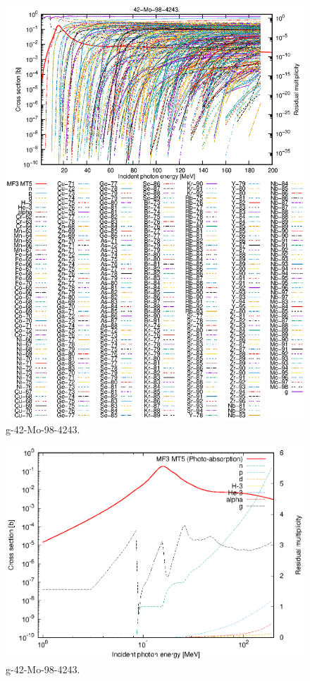 \begin{figure}
 \includegraphics[width=\linewidth]{eps/g_42-Mo-98_4243.eps}
  \caption{g-42-Mo-98-4243.}
\end{figure}
\newpage \clearpage

\begin{figure}
 \includegraphics[width=\linewidth]{eps-log/g_42-Mo-98_4243.eps}
 \caption{g-42-Mo-98-4243.}
\end{figure}
\newpage \clearpage

